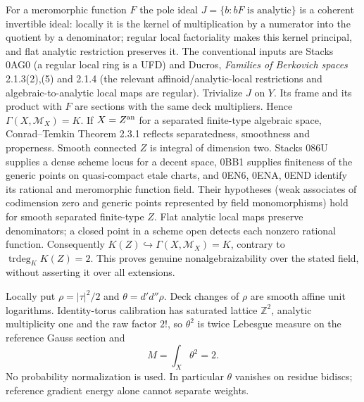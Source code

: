 \documentclass[11pt]{article}
\newcommand{\DD}{d'd''}
\theoremstyle{remark}\newtheorem{remark}[theorem]{Remark}
\begin{document}
For a meromorphic function $F$ the pole ideal
$J=\{b:bF\text{ is analytic}\}$ is a coherent invertible ideal:
locally it is the kernel of multiplication by a numerator into the
quotient by a denominator; regular local factoriality makes this kernel
principal, and flat analytic restriction preserves it. The conventional
inputs are Stacks 0AG0 (a regular local ring is a UFD) and Ducros,
\emph{Families of Berkovich spaces} 2.1.3(2),(5) and 2.1.4 (the
relevant affinoid/analytic-local restrictions and algebraic-to-analytic
local maps are regular). Trivialize $J$ on $Y$. Its frame and its product
with $F$ are sections with the same deck multipliers. Hence
$\Gamma(X,\mathscr M_X)=K$.
If $X=Z^{\rm an}$ for a separated finite-type algebraic space,
Conrad--Temkin Theorem 2.3.1 reflects separatedness, smoothness and
properness. Smooth connected $Z$ is integral of dimension two.
Stacks 086U supplies a dense scheme locus for a decent space, 0BB1
supplies finiteness of the generic points on quasi-compact etale charts,
and 0EN6, 0ENA, 0END identify its rational and meromorphic function
field. Their hypotheses (weak associates of codimension zero and
generic points represented by field monomorphisms) hold for smooth
separated finite-type $Z$. Flat analytic local maps preserve denominators;
a closed point in a scheme open detects each nonzero rational function.
Consequently $K(Z)\hookrightarrow\Gamma(X,\mathscr M_X)=K$, contrary
to $\operatorname{trdeg}_K K(Z)=2$. This proves genuine
nonalgebraizability over the stated field, without asserting it over all
extensions.

Locally put $\rho=|\tau|^2/2$ and $\theta=\DD\rho$.
Deck changes of $\rho$ are smooth affine unit logarithms. Identity-torus
calibration has saturated lattice $\mathbb Z^2$, analytic multiplicity
one and the raw factor $2!$, so $\theta^2$ is twice Lebesgue measure
on the reference Gauss section and
\[
M=\int_X\theta^2=2.
\]
No probability normalization is used. In particular $\theta$ vanishes
on residue bidiscs; reference gradient energy alone cannot separate
weights.
\end{document}
